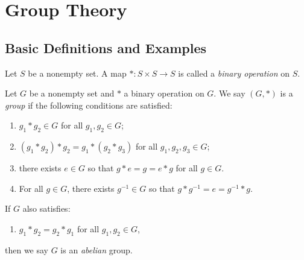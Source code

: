\chapter{Group Theory}

\section{Basic Definitions and Examples}
    \begin{definition}
        Let $S$ be a nonempty set. A map $\ast:S \times S \rightarrow S$ is called a \textit{binary operation} on $S$.
    \end{definition}

    \begin{definition}
        Let $G$ be a nonempty set and $\ast$ a binary operation on $G$. We say $(G,\ast)$ is a \textit{group} if the following conditions are satisfied:
            \begin{enumerate}[label = (\arabic*)]
                \item $g_1 \ast g_2 \in G$ for all $g_1,g_2 \in G$;
                \item $(g_1 \ast g_2) \ast g_2 = g_1 \ast (g_2 \ast g_3)$ for all $g_1,g_2,g_3 \in G$;
                \item there exists $e \in G$ so that $g \ast e = g = e \ast g$ for all $g \in G$.
                \item For all $g \in G$, there exists $g^{-1} \in G$ so that $g \ast g^{-1} = e = g^{-1} \ast g$.
            \end{enumerate}
        If $G$ also satisfies:
            \begin{enumerate}[label = (\arabic*),itemsep=1pt,topsep=3pt]
                \addtocounter{enumi}{4}
                \item $g_1 \ast g_2 = g_2 \ast g_1$ for all $g_1,g_2 \in G$,
            \end{enumerate}
        then we say $G$ is an \textit{abelian} group.
    \end{definition}

